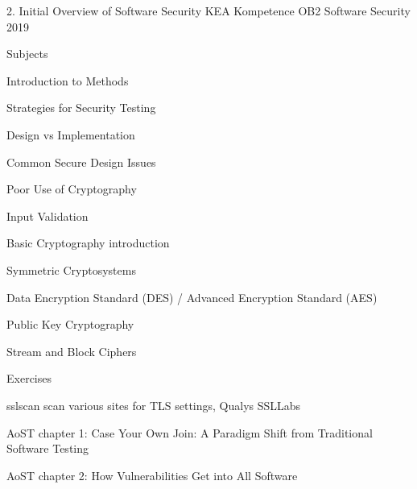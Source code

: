 \documentclass[Screen16to9,17pt]{foils}
\begin{document}
\mytitlepage
{2. Initial Overview of Software Security}
{KEA Kompetence OB2 Software Security 2019}


\begin{list1}
\item Subjects
\begin{list2}
\item Introduction to Methods
\item Strategies for Security Testing
\item Design vs Implementation
\item Common  Secure Design Issues
\item Poor Use of Cryptography
\item Input Validation
\item Basic Cryptography introduction
\item Symmetric Cryptosystems
\item Data Encryption Standard (DES) / Advanced Encryption Standard (AES)
\item Public Key Cryptography
\item Stream and Block Ciphers
\end{list2}
\item Exercises
\begin{list2}
\item sslscan scan various sites for TLS settings, Qualys SSLLabs
\end{list2}
\end{list1}


\begin{list1}
\item AoST chapter 1: Case Your Own Join: A Paradigm Shift from Traditional Software Testing
\item AoST chapter 2: How Vulnerabilities Get into All Software 
\end{list1}



\begin{list1}
\item
\end{list1}





\end{document}
